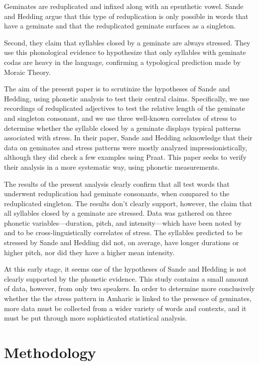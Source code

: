 \documentclass[12pt]{scrartcl}
\begin{document}
Geminates are reduplicated and infixed along with an epenthetic vowel. Sande and Hedding argue that this type of reduplication is only possible in words that have a geminate and that the reduplicated geminate surfaces as a singleton. 

Second, they claim that syllables closed by a geminate are always stressed. They use this phonological evidence to hypothesize that only syllables with geminate codas are heavy in the language, confirming a typological prediction made by Moraic Theory.

The aim of the present paper is to scrutinize the hypotheses of Sande and Hedding, using phonetic analysis to test their central claims. Specifically, we use recordings of reduplicated adjectives to test the relative length of the geminate and singleton consonant, and we use three well-known correlates of stress to determine whether the syllable closed by a geminate displays typical patterns associated with stress. In their paper, Sande and Hedding acknowledge that their data on geminates and stress patterns were mostly analyzed impressionistically, although they did check a few examples using Praat. This paper seeks to verify their analysis in a more systematic way, using phonetic measurements. 

The results of the present analysis clearly confirm that all test words that underwent reduplication had geminate consonants, when compared to the reduplicated singleton. The results don't clearly support, however, the claim that all syllables closed by a geminate are stressed. Data was gathered on three phonetic variables---duration, pitch, and intensity---which have been noted by \cite{hayes1995} and \cite{fox2002} to be cross-linguistically correlates of stress. The syllables predicted to be stressed by Sande and Hedding did not, on average, have longer durations or higher pitch, nor did they have a higher mean intensity. 

At this early stage, it seems one of the hypotheses of Sande and Hedding is not clearly supported by the phonetic evidence. This study contains a small amount of data, however, from only two speakers. In order to determine more conclusively whether the the stress pattern in Amharic is linked to the presence of geminates, more data must be collected from a wider variety of words and contexts, and it must be put through more sophisticated statistical analysis.

\section{Methodology}
\end{document}
